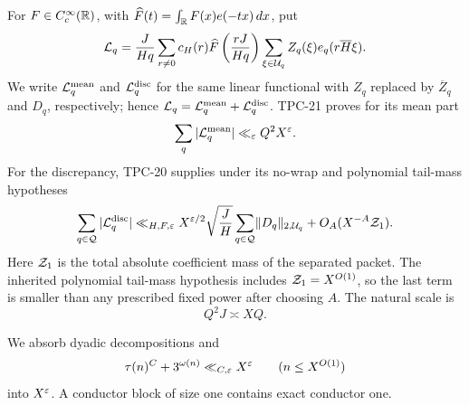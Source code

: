 For \(F\in C_c^\infty(\mathbb R)\), with
\(\widehat F(t)=\int_\mathbb R F(x)e(-tx)\,dx\), put
\begin{equation}
 \mathcal L_q=\frac{J}{Hq}\sum_{r\ne0}c_H(r)
 \widehat F\left(\frac{rJ}{Hq}\right)
 \sum_{\xi\in\mathcal U_q}Z_q(\xi)e_q(r\overline H\xi).
 \label{eq:scalar-packet}
\end{equation}
We write \(\mathcal L_q^{\rm mean}\) and \(\mathcal L_q^{\rm disc}\) for the same
linear functional with \(Z_q\) replaced by \(\overline Z_q\) and
\(D_q\), respectively; hence
\(\mathcal L_q=\mathcal L_q^{\rm mean}+\mathcal L_q^{\rm disc}\).
TPC-21 proves for its mean part
\begin{equation}
 \sum_q|\mathcal L_q^{\rm mean}|\ll_\varepsilon Q^2X^\varepsilon.
 \label{eq:imported-mean-bound}
\end{equation}
For the discrepancy, TPC-20 supplies under its no-wrap and polynomial
tail-mass hypotheses
\begin{equation}
 \sum_{q\in\mathcal Q}|\mathcal L_q^{\rm disc}|
 \ll_{H,F,\varepsilon}X^{\varepsilon/2}\sqrt{\frac JH}
 \sum_{q\in\mathcal Q}\lVert D_q\rVert_{2,\mathcal U_q}
 +O_A(X^{-A}\mathcal Z_1).
 \label{eq:inherited-norm-route}
\end{equation}
Here \(\mathcal Z_1\) is the total absolute coefficient mass of the separated
packet.  The inherited polynomial tail-mass hypothesis includes
\(\mathcal Z_1=X^{O(1)}\), so the last term is smaller than any prescribed
fixed power after choosing \(A\).
The natural scale is
\begin{equation}
 Q^2J\asymp XQ.
 \label{eq:natural-scale}
\end{equation}

We absorb dyadic decompositions and
\begin{equation}
 \tau(n)^C+3^{\omega(n)}\ll_{C,\varepsilon}X^\varepsilon
 \qquad(n\le X^{O(1)})
 \label{eq:divisor-soft}
\end{equation}
into \(X^\varepsilon\).  A conductor block of size one contains exact
conductor one.

